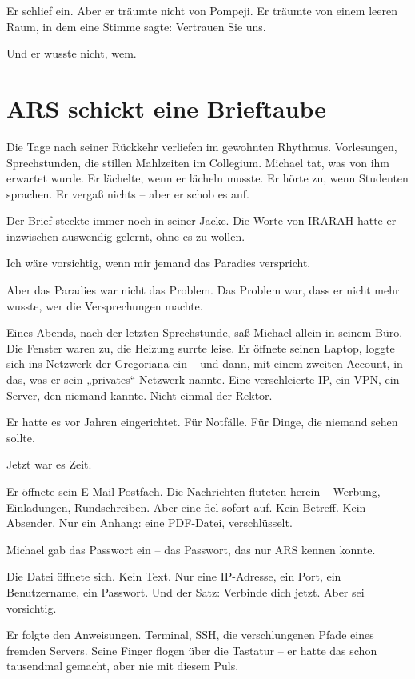 \documentclass[
]{article}
\begin{document}
Er schlief ein. Aber er träumte nicht von Pompeji. Er träumte von einem leeren Raum, in dem eine Stimme sagte: Vertrauen Sie uns.

Und er wusste nicht, wem.

\section{ARS schickt eine Brieftaube}\label{ars-schickt-eine-brieftaube}

Die Tage nach seiner Rückkehr verliefen im gewohnten Rhythmus. Vorlesungen, Sprechstunden, die stillen Mahlzeiten im Collegium. Michael tat, was von ihm erwartet wurde. Er lächelte, wenn er lächeln musste. Er hörte zu, wenn Studenten sprachen. Er vergaß nichts -- aber er schob es auf.

Der Brief steckte immer noch in seiner Jacke. Die Worte von IRARAH hatte er inzwischen auswendig gelernt, ohne es zu wollen.

Ich wäre vorsichtig, wenn mir jemand das Paradies verspricht.

Aber das Paradies war nicht das Problem. Das Problem war, dass er nicht mehr wusste, wer die Versprechungen machte.

Eines Abends, nach der letzten Sprechstunde, saß Michael allein in seinem Büro. Die Fenster waren zu, die Heizung surrte leise. Er öffnete seinen Laptop, loggte sich ins Netzwerk der Gregoriana ein -- und dann, mit einem zweiten Account, in das, was er sein „privates`` Netzwerk nannte. Eine verschleierte IP, ein VPN, ein Server, den niemand kannte. Nicht einmal der Rektor.

Er hatte es vor Jahren eingerichtet. Für Notfälle. Für Dinge, die niemand sehen sollte.

Jetzt war es Zeit.

Er öffnete sein E-Mail-Postfach. Die Nachrichten fluteten herein -- Werbung, Einladungen, Rundschreiben. Aber eine fiel sofort auf. Kein Betreff. Kein Absender. Nur ein Anhang: eine PDF-Datei, verschlüsselt.

Michael gab das Passwort ein -- das Passwort, das nur ARS kennen konnte.

Die Datei öffnete sich. Kein Text. Nur eine IP-Adresse, ein Port, ein Benutzername, ein Passwort. Und der Satz: Verbinde dich jetzt. Aber sei vorsichtig.

Er folgte den Anweisungen. Terminal, SSH, die verschlungenen Pfade eines fremden Servers. Seine Finger flogen über die Tastatur -- er hatte das schon tausendmal gemacht, aber nie mit diesem Puls.
\end{document}
